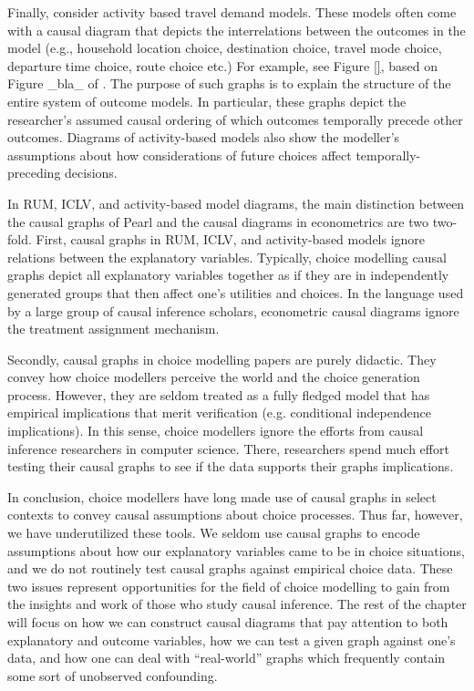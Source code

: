 
Finally, consider activity based travel demand models.
These models often come with a causal diagram that depicts the interrelations between the outcomes in the model (e.g., household location choice, destination choice, travel mode choice, departure time choice, route choice etc.)
For example, see Figure \ref{}, based on Figure \_bla\_ of \citet{bradley_2010_sacsim}.
The purpose of such graphs is to explain the structure of the entire system of outcome models.
In particular, these graphs depict the researcher's assumed causal ordering of which outcomes temporally precede other outcomes.
Diagrams of activity-based models also show the modeller's assumptions about how considerations of future choices affect temporally-preceding decisions.

In RUM, ICLV, and activity-based model diagrams, the main distinction between the causal graphs of Pearl \citet{article_name} and the causal diagrams in econometrics are two two-fold.
First, causal graphs in RUM, ICLV, and activity-based models ignore relations between the explanatory variables.
Typically, choice modelling causal graphs depict all explanatory variables together as if they are in independently generated groups that then affect one's utilities and choices.
In the language used by a large group of causal inference scholars, econometric causal diagrams ignore the treatment assignment mechanism.

Secondly, causal graphs in choice modelling papers are purely didactic.
They convey how choice modellers perceive the world and the choice generation process.
However, they are seldom treated as a fully fledged model that has empirical implications that merit verification (e.g. conditional independence implications).
In this sense, choice modellers ignore the efforts from causal inference researchers in computer science.
There, researchers spend much effort testing their causal graphs to see if the data supports their graphs implications.

In conclusion, choice modellers have long made use of causal graphs in select contexts to convey causal assumptions about choice processes.
Thus far, however, we have underutilized these tools.
We seldom use causal graphs to encode assumptions about how our explanatory variables came to be in choice situations, and we do not routinely test causal graphs against empirical choice data.
These two issues represent opportunities for the field of choice modelling to gain from the insights and work of those who study causal inference.
The rest of the chapter will focus on how we can construct causal diagrams that pay attention to both explanatory and outcome variables, how we can test a given graph against one's data, and how one can deal with ``real-world'' graphs which frequently contain some sort of unobserved confounding.
